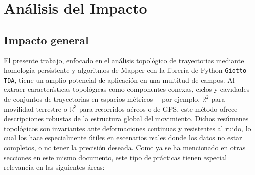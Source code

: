 \section{Análisis del Impacto}


\subsection{Impacto general}

El presente trabajo, enfocado en el análisis topológico de trayectorias mediante homología persistente y algoritmos de Mapper con la librería de Python \texttt{Giotto-TDA}, tiene un amplio potencial de aplicación en una multitud de campos. Al extraer características topológicas como componentes conexas, ciclos y cavidades de conjuntos de trayectorias en espacios métricos —por ejemplo, \(\mathbb{R}^2\) para movilidad terrestre o \(\mathbb{R}^3\) para recorridos aéreos o de GPS, este método ofrece descripciones robustas de la estructura global del movimiento. Dichos resúmenes topológicos son invariantes ante deformaciones continuas y resistentes al ruido, lo cual los hace especialmente útiles en escenarios reales donde los datos no estar completos, o no tener la precisión deseada. Como ya se ha mencionado en otras secciones en este mismo documento, este tipo de prácticas tienen especial relevancia en las siguientes áreas:

